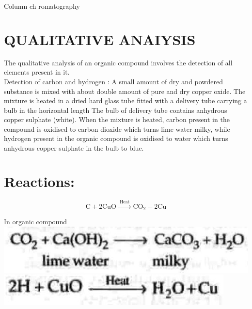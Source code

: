 \documentclass[10pt]{article}
\begin{document}
Column ch romatography

\section*{QUALITATIVE ANAIYSIS}
The qualitative analysis of an organic compound involves the detection of all elements present in it.\\
Detection of carbon and hydrogen : A small amount of dry and powdered substance is mixed with about double amount of pure and dry copper oxide. The mixture is heated in a dried hard glass tube fitted with a delivery tube carrying a bulb in the horizontal length The bulb of delivery tube contains anhydrous copper sulphate (white). When the mixture is heated, carbon present in the compound is oxidised to carbon dioxide which turns lime water milky, while hydrogen present in the organic compound is oxidised to water which turns anhydrous copper sulphate in the bulb to blue.

\section*{Reactions:}
$$
\mathrm{C}+2 \mathrm{CuO} \xrightarrow{\text { Heat }} \mathrm{CO}_{2}+2 \mathrm{Cu}
$$

In organic compound\\
\includegraphics[max width=\textwidth, center]{2025_01_28_8470952b98110cec3aabg-106(1)}\\
\includegraphics[max width=\textwidth, center]{2025_01_28_8470952b98110cec3aabg-106}
\end{document}

